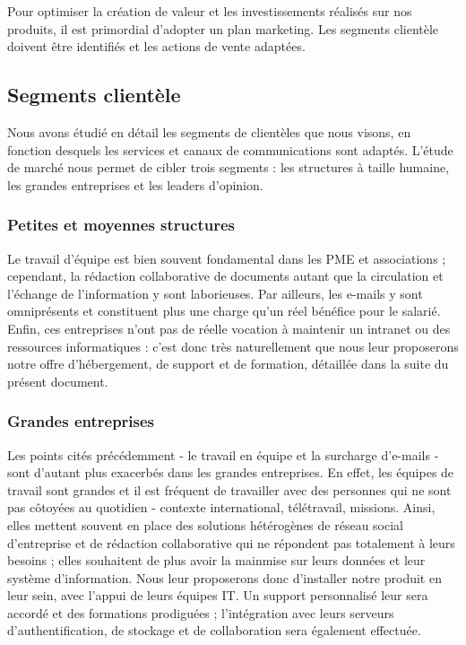 \documentclass[10pt,twocolumn,a4paper,utf8x]{article}
\begin{document}
Pour optimiser la création de valeur et les investissements réalisés sur
nos produits, il est primordial d'adopter un plan marketing. Les
segments clientèle doivent être identifiés et les actions de vente
adaptées.

\subsection{Segments clientèle}

Nous avons étudié en détail les segments de clientèles que nous visons,
en fonction desquels les services et canaux de communications sont
adaptés. L'étude de marché nous permet de cibler trois segments : les
structures à taille humaine, les grandes entreprises et les leaders
d'opinion.

\subsubsection{Petites et moyennes structures}

Le travail d'équipe est bien souvent fondamental dans les PME et
associations ; cependant, la rédaction collaborative de documents autant
que la circulation et l'échange de l'information y sont laborieuses. Par
ailleurs, les e-mails y sont omniprésents et constituent plus une charge
qu'un réel bénéfice pour le salarié. Enfin, ces entreprises n'ont pas de
réelle vocation à maintenir un intranet ou des ressources informatiques
: c'est donc très naturellement que nous leur proposerons notre offre
d'hébergement, de support et de formation, détaillée dans la suite du
présent document.

\subsubsection{Grandes entreprises}

Les points cités précédemment - le travail en équipe et la surcharge
d'e-mails - sont d'autant plus exacerbés dans les grandes entreprises.
En effet, les équipes de travail sont grandes et il est fréquent de
travailler avec des personnes qui ne sont pas côtoyées au quotidien -
contexte international, télétravail, missions. Ainsi, elles mettent
souvent en place des solutions hétérogènes de réseau social d'entreprise
et de rédaction collaborative qui ne répondent pas totalement à leurs
besoins ; elles souhaitent de plus avoir la mainmise sur leurs données
et leur système d'information. Nous leur proposerons donc d'installer
notre produit en leur sein, avec l'appui de leurs équipes IT. Un support
personnalisé leur sera accordé et des formations prodiguées ;
l'intégration avec leurs serveurs d'authentification, de stockage et de
collaboration sera également effectuée.
\end{document}

